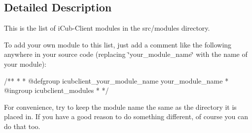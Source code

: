 \subsection{Detailed Description}
This is the list of i\+Cub-\/\+Client modules in the src/modules directory. 

To add your own module to this list, just add a comment like the following anywhere in your source code (replacing \char`\"{}your\+\_\+module\+\_\+name\char`\"{} with the name of your module)\+: \begin{DoxyVerb}  /**
   *
   * @defgroup icubclient_your_module_name your_module_name
   * @ingroup icubclient_modules
   *
   */
\end{DoxyVerb}


For convenience, try to keep the module name the same as the directory it is placed in. If you have a good reason to do something different, of course you can do that too. 
